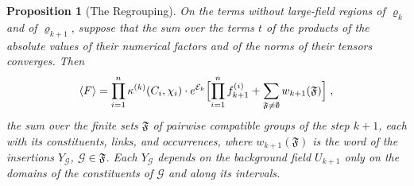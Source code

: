 \documentclass[11pt]{preprint}
\numberwithin{equation}{section}
\newtheorem{proposition}[theorem]{Proposition}
\theoremstyle{definition}
\theoremstyle{remark}
\theoremstyle{plain}
\begin{document}
\begin{proposition}[The Regrouping]\label{prop:regrouping}
On the terms without large-field regions of $\varrho_k$ and of $\varrho_{k+1}$, suppose that the sum over the terms $t$ of the products of the absolute values of their numerical factors and of the norms of their tensors converges. Then
\begin{equation}\label{eq:regrouped}
    \langle F\rangle = \prod_{i=1}^{n}\kappa^{(k)}(C_i, \chi_i)\cdot e^{\mathcal E_k}\Bigl[\prod_{i=1}^{n}f^{(i)}_{k+1} + \sum_{\mathfrak F \neq \emptyset}w_{k+1}(\mathfrak F)\Bigr]\;,
\end{equation}
the sum over the finite sets $\mathfrak F$ of pairwise compatible groups of the step $k + 1$, each with its constituents, links, and occurrences, where $w_{k+1}(\mathfrak F)$ is the word of the insertions $Y_{\mathcal G}$, $\mathcal G \in \mathfrak F$. Each $Y_{\mathcal G}$ depends on the background field $U_{k+1}$ only on the domains of the constituents of $\mathcal G$ and along its intervals.
\end{proposition}
\end{document}
